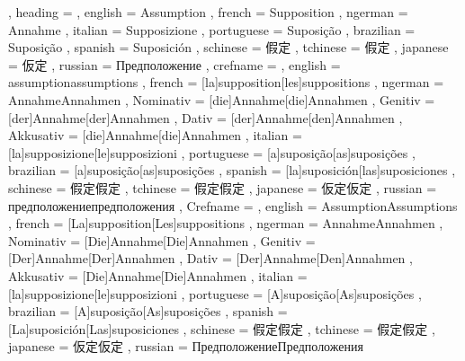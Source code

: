   {
    , heading =   {
                    , english     = Assumption
                    , french      = Supposition
                    , ngerman     = Annahme
                    , italian     = Supposizione
                    , portuguese  = Suposição
                    , brazilian   = Suposição
                    , spanish     = Suposición
                    , schinese    = 假定
                    , tchinese    = 假定
                    , japanese    = 仮定
                    , russian     = Предположение
                  }
    , crefname =  {
                    , english     = {assumption}{assumptions}
                    , french      = [la]{supposition}[les]{suppositions}
                    , ngerman     = { {Annahme}{Annahmen}
                                      , Nominativ = [die]{Annahme}[die]{Annahmen}
                                      , Genitiv   = [der]{Annahme}[der]{Annahmen}
                                      , Dativ     = [der]{Annahme}[den]{Annahmen}
                                      , Akkusativ = [die]{Annahme}[die]{Annahmen}
                                    }
                    , italian     = [la]{supposizione}[le]{supposizioni}
                    , portuguese  = [a]{suposição}[as]{suposições}
                    , brazilian   = [a]{suposição}[as]{suposições}
                    , spanish     = [la]{suposición}[las]{suposiciones}
                    , schinese    = {假定}{假定}
                    , tchinese    = {假定}{假定}
                    , japanese    = {仮定}{仮定}
                    , russian     = {предположение}{предположения}
                  }
    , Crefname =  {
                    , english     = {Assumption}{Assumptions}
                    , french      = [La]{supposition}[Les]{suppositions}
                    , ngerman     = { {Annahme}{Annahmen}
                                      , Nominativ = [Die]{Annahme}[Die]{Annahmen}
                                      , Genitiv   = [Der]{Annahme}[Der]{Annahmen}
                                      , Dativ     = [Der]{Annahme}[Den]{Annahmen}
                                      , Akkusativ = [Die]{Annahme}[Die]{Annahmen}
                                    }
                    , italian     = [la]{supposizione}[le]{supposizioni}
                    , portuguese  = [A]{suposição}[As]{suposições}
                    , brazilian   = [A]{suposição}[As]{suposições}
                    , spanish     = [La]{suposición}[Las]{suposiciones}
                    , schinese    = {假定}{假定}
                    , tchinese    = {假定}{假定}
                    , japanese    = {仮定}{仮定}
                    , russian     = {Предположение}{Предположения}
                  }
  }

